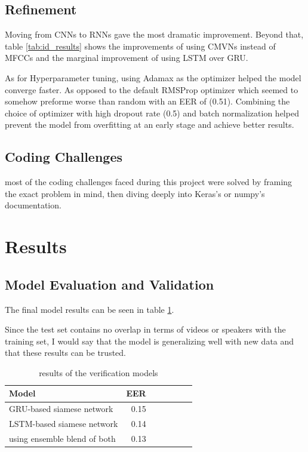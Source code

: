\documentclass{article}
\begin{document}
\subsection{Refinement}
Moving from CNNs to RNNs gave the most dramatic improvement. Beyond that, table \ref{tab:id_results} shows the improvements of using CMVNs instead of MFCCs and the marginal improvement of using LSTM over GRU.

As for Hyperparameter tuning, using Adamax as the optimizer helped the model converge faster. As opposed to the default RMSProp optimizer which seemed to somehow preforme worse than random with an EER of (0.51). Combining the choice of optimizer with high dropout rate (0.5) and batch normalization helped prevent the model from overfitting at an early stage and achieve better results.

\subsection{Coding Challenges}
most of the coding challenges faced during this project were solved by framing the exact problem in mind, then diving deeply into Keras's\cite{chollet2015keras} or numpy's documentation.
\section{Results}
\subsection{Model Evaluation and Validation}
The final model results can be seen in table \ref{tab:ver_results}.

Since the test set contains no overlap in terms of videos or speakers with the training set, I would say that the model is generalizing well with new data and that these results can be trusted.
\begin{table}[H]
    \centering
    \begin{tabular}{l*{6}r}
        Model & EER\\
        \hline
        GRU-based siamese network & 0.15  \\
        LSTM-based siamese network & 0.14  \\
        using ensemble blend of both & 0.13  \\
    \end{tabular}
    \caption{results of the verification models}
    \label{tab:ver_results}
\end{table}
\end{document}
